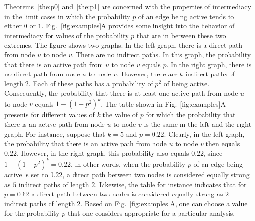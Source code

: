 \documentclass{article}
\theoremstyle{definition}
\newcommand{\subfigref}[2]{Fig.~\ref{fig:#1}#2\xspace}
\newcommand{\therefs}[2]{Theorems~\ref{the:#1} and~\ref{the:#2}\xspace}
\begin{document}
\therefs{p0}{p1} are concerned with the properties of intermediacy in the limit cases in which the probability $p$ of an edge being active tends to either $0$ or $1$. \subfigref{examples}{A} provides some insight into the behavior of intermediacy for values of the probability $p$ that are in between these two extremes. The figure shows two graphs. In the left graph, there is a direct path from node $u$ to node $v$. There are no indirect paths. In this graph, the probability that there is an active path from $u$ to node $v$ equals $p$. In the right graph, there is no direct path from node $u$ to node $v$. However, there are $k$ indirect paths of length $2$. Each of these paths has a probability of $p^2$ of being active. Consequently, the probability that there is at least one active path from node $u$ to node $v$ equals $1-(1-p^2)^k$. The table shown in \subfigref{examples}{A} presents for different values of $k$ the value of $p$ for which the probability that there is an active path from node $u$ to node $v$ is the same in the left and the right graph. For instance, suppose that $k = 5$ and $p = 0.22$. Clearly, in the left graph, the probability that there is an active path from node $u$ to node $v$ then equals $0.22$. However, in the right graph, this probability also equals $0.22$, since $1-(1-p^2)^k = 0.22$. In other words, when the probability $p$ of an edge being active is set to $0.22$, a direct path between two nodes is considered equally strong as $5$ indirect paths of length $2$. Likewise, the table for instance indicates that for $p = 0.62$ a direct path between two nodes is considered equally strong as $2$ indirect paths of length $2$. Based on \subfigref{examples}{A}, one can choose a value for the probability $p$ that one considers appropriate for a particular analysis.
\end{document}
